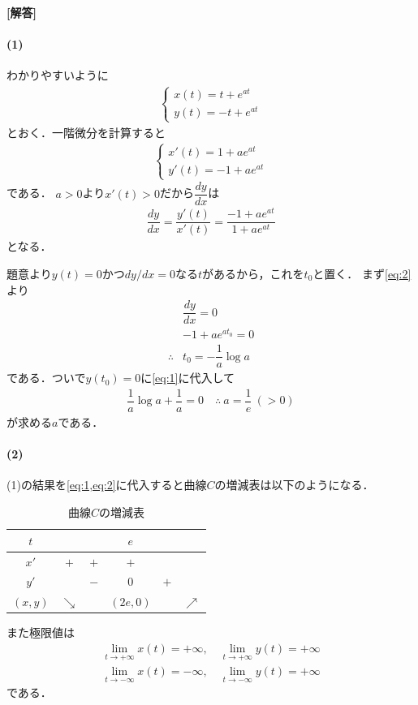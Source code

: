 \documentclass[../../main.tex]{subfiles}
\begin{document}
\begin{oframed}
  
\end{oframed}

{\bf [解答]}

\paragraph{(1)}
わかりやすいように
\begin{align}
  \begin{cases}
    x(t)=t+e^{at} \\
    y(t)=-t+e^{at}
  \end{cases} \label{eq:1}
\end{align}
とおく．一階微分を計算すると
\begin{align}
  \begin{cases}
    x'(t)=1+ae^{at} \\
    y'(t)=-1+ae^{at}
  \end{cases} \label{eq:2}
\end{align}
である．
$a>0$より$x'(t)>0$だから$\dfrac{dy}{dx}$は
\begin{align}
  \dfrac{dy}{dx}=\dfrac{y'(t)}{x'(t)}=\dfrac{-1+ae^{at}}{1+ae^{at}}
\end{align}
となる．

題意より$y(t)=0$かつ$dy/dx=0$なる$t$があるから，これを$t_0$と置く．
まず\cref{eq:2}より
\begin{align}
  &\dfrac{dy}{dx}=0 \\
  &-1+ae^{at_0} = 0 \\
  \therefore
  &t_0=-\dfrac{1}{a}\log a
\end{align}
である．ついで$y(t_0)=0$に\cref{eq:1}に代入して
\begin{align}
  \dfrac{1}{a}\log a+\dfrac{1}{a}=0 \quad\therefore\ a=\dfrac{1}{e}\ (>0)
\end{align}
が求める$a$である．

\paragraph{(2)}
(1)の結果を\cref{eq:1,eq:2}に代入すると曲線$C$の増減表は以下のようになる．
\begin{table}[htb]
  \centering
  \caption{曲線$C$の増減表}
  \begin{tabular}{c|ccccc}
    $t$ & & & $e$ & & \\
    \hline
    $x'$ & $+$ & $+$ & $+$ & & \\
    \hline
    $y'$ & & $-$ & $0$ & $+$ & \\
    \hline
    $(x,y)$ & $\searrow$ & & $(2e,0)$ & & $\nearrow$
  \end{tabular}
\end{table}
また極限値は
\begin{align}
  \lim_{t\to+\infty}x(t) = +\infty, \quad \lim_{t\to+\infty}y(t) = +\infty \\
  \lim_{t\to-\infty}x(t) = -\infty, \quad \lim_{t\to-\infty}y(t) = +\infty
\end{align}
である．
\end{document}
